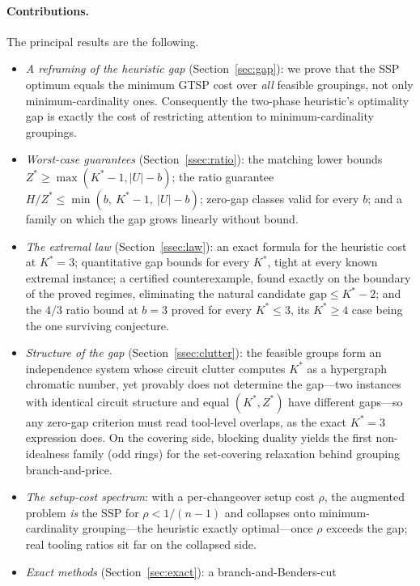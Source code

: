 \documentclass[11pt,a4paper]{article}
\theoremstyle{plain}
\theoremstyle{definition}
\theoremstyle{remark}
\newcommand{\U}{U}
\newcommand{\Kst}{K^{\ast}}
\newcommand{\Zst}{Z^{\ast}}
\begin{document}
\paragraph{Contributions.}
The principal results are the following.
\begin{itemize}[noitemsep,topsep=2pt]
  \item \emph{A reframing of the heuristic gap} (Section~\ref{sec:gap}): we prove
  that the SSP optimum equals the minimum GTSP cost over \emph{all} feasible
  groupings, not only minimum-cardinality ones. Consequently the two-phase
  heuristic's optimality gap is exactly the cost of restricting attention to
  minimum-cardinality groupings.
  \item \emph{Worst-case guarantees} (Section~\ref{ssec:ratio}): the matching
  lower bounds $\Zst\ge\max(\Kst-1,\lvert\U\rvert-b)$; the ratio guarantee
  $H/\Zst\le\min(b,\ \Kst-1,\ \lvert\U\rvert-b)$; zero-gap classes valid for
  every $b$; and a family on which the gap grows linearly without bound.
  \item \emph{The extremal law} (Section~\ref{ssec:law}): an exact formula for
  the heuristic cost at $\Kst=3$; quantitative gap bounds for every $\Kst$,
  tight at every known extremal instance; a certified counterexample, found
  exactly on the boundary of the proved regimes, eliminating the natural
  candidate $\mathrm{gap}\le\Kst-2$; and the $4/3$ ratio bound at $b=3$ proved
  for every $\Kst\le3$, its $\Kst\ge4$ case being the one surviving
  conjecture.
  \item \emph{Structure of the gap} (Section~\ref{ssec:clutter}): the feasible
  groups form an independence system whose circuit clutter computes $\Kst$ as
  a hypergraph chromatic number, yet provably does not determine the gap---two
  instances with identical circuit structure and equal $(\Kst,\Zst)$ have
  different gaps---so any zero-gap criterion must read tool-level overlaps, as
  the exact $\Kst=3$ expression does. On the covering side, blocking duality
  yields the first non-idealness family (odd rings) for the set-covering
  relaxation behind grouping branch-and-price.
  \item \emph{The setup-cost spectrum}: with a per-changeover setup cost $\rho$,
  the augmented problem \emph{is} the SSP for $\rho<1/(n-1)$ and collapses onto
  minimum-cardinality grouping---the heuristic exactly optimal---once $\rho$
  exceeds the gap; real tooling ratios sit far on the collapsed side.
  \item \emph{Exact methods} (Section~\ref{sec:exact}): a branch-and-Benders-cut

\end{itemize}
\end{document}
